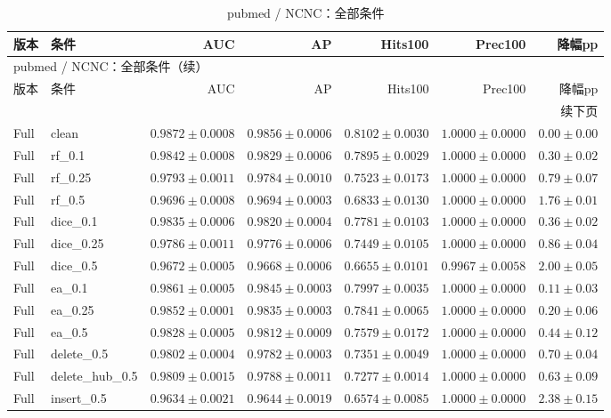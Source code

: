\documentclass[UTF8,a4paper,11pt,fontset=fandol]{ctexart}
\begin{document}
{\footnotesize
\setlength{\tabcolsep}{3pt}
\begin{longtable}{llrrrrr}
\caption{pubmed / NCNC：全部条件}\\
\toprule
版本 & 条件 & AUC & AP & Hits100 & Prec100 & 降幅pp \\
\midrule
\endfirsthead
\multicolumn{7}{l}{pubmed / NCNC：全部条件（续）}\\
\toprule
版本 & 条件 & AUC & AP & Hits100 & Prec100 & 降幅pp \\
\midrule
\endhead
\midrule\multicolumn{7}{r}{续下页}\\
\endfoot
\bottomrule\endlastfoot
Full & clean & $0.9872\pm0.0008$ & $0.9856\pm0.0006$ & $0.8102\pm0.0030$ & $1.0000\pm0.0000$ & $0.00\pm0.00$ \\
Full & rf\_0.1 & $0.9842\pm0.0008$ & $0.9829\pm0.0006$ & $0.7895\pm0.0029$ & $1.0000\pm0.0000$ & $0.30\pm0.02$ \\
Full & rf\_0.25 & $0.9793\pm0.0011$ & $0.9784\pm0.0010$ & $0.7523\pm0.0173$ & $1.0000\pm0.0000$ & $0.79\pm0.07$ \\
Full & rf\_0.5 & $0.9696\pm0.0008$ & $0.9694\pm0.0003$ & $0.6833\pm0.0130$ & $1.0000\pm0.0000$ & $1.76\pm0.01$ \\
Full & dice\_0.1 & $0.9835\pm0.0006$ & $0.9820\pm0.0004$ & $0.7781\pm0.0103$ & $1.0000\pm0.0000$ & $0.36\pm0.02$ \\
Full & dice\_0.25 & $0.9786\pm0.0011$ & $0.9776\pm0.0006$ & $0.7449\pm0.0105$ & $1.0000\pm0.0000$ & $0.86\pm0.04$ \\
Full & dice\_0.5 & $0.9672\pm0.0005$ & $0.9668\pm0.0006$ & $0.6655\pm0.0101$ & $0.9967\pm0.0058$ & $2.00\pm0.05$ \\
Full & ea\_0.1 & $0.9861\pm0.0005$ & $0.9845\pm0.0003$ & $0.7997\pm0.0035$ & $1.0000\pm0.0000$ & $0.11\pm0.03$ \\
Full & ea\_0.25 & $0.9852\pm0.0001$ & $0.9835\pm0.0003$ & $0.7841\pm0.0065$ & $1.0000\pm0.0000$ & $0.20\pm0.06$ \\
Full & ea\_0.5 & $0.9828\pm0.0005$ & $0.9812\pm0.0009$ & $0.7579\pm0.0172$ & $1.0000\pm0.0000$ & $0.44\pm0.12$ \\
Full & delete\_0.5 & $0.9802\pm0.0004$ & $0.9782\pm0.0003$ & $0.7351\pm0.0049$ & $1.0000\pm0.0000$ & $0.70\pm0.04$ \\
Full & delete\_hub\_0.5 & $0.9809\pm0.0015$ & $0.9788\pm0.0011$ & $0.7277\pm0.0014$ & $1.0000\pm0.0000$ & $0.63\pm0.09$ \\
Full & insert\_0.5 & $0.9634\pm0.0021$ & $0.9644\pm0.0019$ & $0.6574\pm0.0085$ & $1.0000\pm0.0000$ & $2.38\pm0.15$ \\

\end{longtable}}
\end{document}
